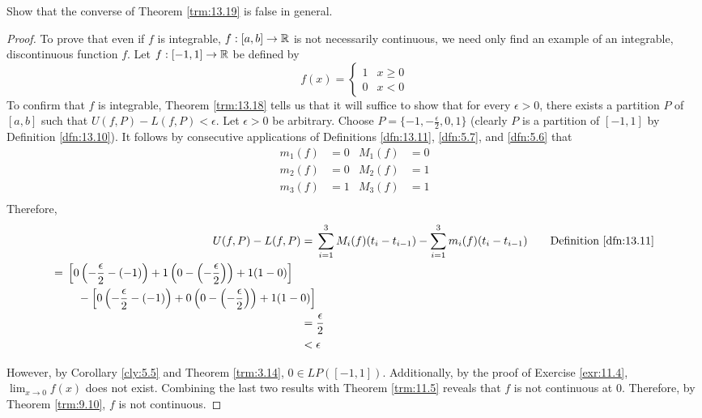 \documentclass[../main.tex]{subfiles}
\begin{document}
\begin{exercise}\label{exr:13.22}
    Show that the converse of Theorem \ref{trm:13.19} is false in general.
    \begin{proof}
        To prove that even if $f$ is integrable, $f:[a,b]\to\mathbb{R}$ is not necessarily continuous, we need only find an example of an integrable, discontinuous function $f$. Let $f:[-1,1]\to\mathbb{R}$ be defined by
        \begin{equation*}
            f(x) =
            \begin{cases}
                1 & x\geq 0\\
                0 & x<0
            \end{cases}
        \end{equation*}
        To confirm that $f$ is integrable, Theorem \ref{trm:13.18} tells us that it will suffice to show that for every $\epsilon>0$, there exists a partition $P$ of $[a,b]$ such that $U(f,P)-L(f,P)<\epsilon$. Let $\epsilon>0$ be arbitrary. Choose $P=\{-1,-\frac{\epsilon}{2},0,1\}$ (clearly $P$ is a partition of $[-1,1]$ by Definition \ref{dfn:13.10}). It follows by consecutive applications of Definitions \ref{dfn:13.11}, \ref{dfn:5.7}, and \ref{dfn:5.6} that
        \begin{align*}
            m_1(f) &= 0&
                M_1(f) &= 0\\
            m_2(f) &= 0&
                M_2(f) &= 1\\
            m_3(f) &= 1&
                M_3(f) &= 1\\
        \end{align*}
        Therefore,
        \begin{align*}
            U(f,P)-L(f,P) ={}& \sum_{i=1}^3M_i(f)(t_i-t_{i-1})-\sum_{i=1}^3m_i(f)(t_i-t_{i-1})\tag*{Definition \ref{dfn:13.11}}\\
            \begin{split}
                ={}& \left[ 0\left( -\frac{\epsilon}{2}-(-1) \right)+1\left( 0-\left( -\frac{\epsilon}{2} \right) \right)+1(1-0) \right]\\
                   &\quad -\left[ 0\left( -\frac{\epsilon}{2}-(-1) \right)+0\left( 0-\left( -\frac{\epsilon}{2} \right) \right)+1(1-0) \right]
            \end{split}\\
            ={}& \frac{\epsilon}{2}\\
            <{}& \epsilon
        \end{align*}\par
        However, by Corollary \ref{cly:5.5} and Theorem \ref{trm:3.14}, $0\in LP([-1,1])$. Additionally, by the proof of Exercise \ref{exr:11.4}, $\lim_{x\to 0}f(x)$ does not exist. Combining the last two results with Theorem \ref{trm:11.5} reveals that $f$ is not continuous at 0. Therefore, by Theorem \ref{trm:9.10}, $f$ is not continuous.
    \end{proof}
\end{exercise}
\end{document}
